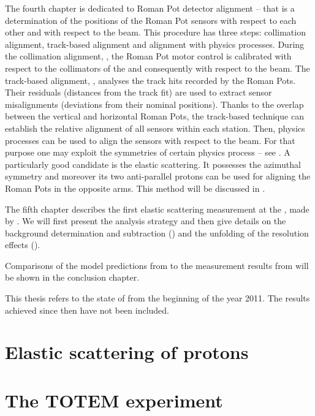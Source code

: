 The fourth chapter is dedicated to Roman Pot detector alignment -- that is a determination of the positions of the Roman Pot sensors with respect to each other and with respect to the beam. This procedure has three steps: collimation alignment, track-based alignment and alignment with physics processes. During the collimation alignment, , the Roman Pot motor control is calibrated with respect to the collimators of the  and consequently with respect to the beam. The track-based alignment, , analyses the track hits recorded by the Roman Pots. Their residuals (distances from the track fit) are used to extract sensor misalignments (deviations from their nominal positions). Thanks to the overlap between the vertical and horizontal Roman Pots, the track-based technique can establish the relative alignment of all sensors within each station. Then, physics processes can be used to align the sensors with respect to the beam. For that purpose one may exploit the symmetries of certain physics process -- see . A particularly good candidate is the elastic scattering. It possesses the azimuthal symmetry and moreover its two anti-parallel protons can be used for aligning the Roman Pots in the opposite arms. This method will be discussed in .

The fifth chapter describes the first elastic scattering measurement at the , made by . We will first present the analysis strategy and then give details on the background determination and subtraction () and the unfolding of the resolution effects ().

Comparisons of the model predictions from  to the measurement results from  will be shown in the conclusion chapter.

This thesis refers to the state of  from the beginning of the year 2011. The results achieved since then have not been included.

\chapter[el]{Elastic scattering of protons}

\chapter[ttm]{The TOTEM experiment}


